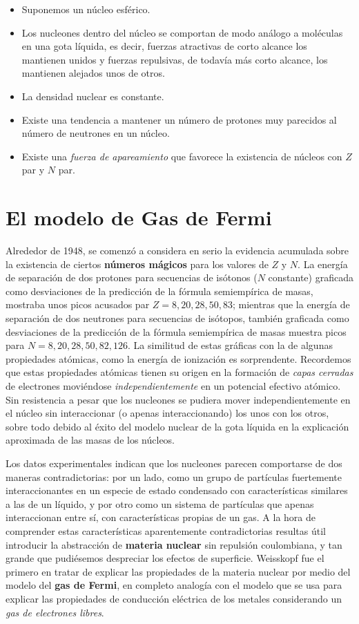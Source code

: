 \begin{itemize}
    \item Suponemos un núcleo esférico.
    \item Los nucleones dentro del núcleo se comportan de modo análogo a moléculas en una gota líquida, es decir, fuerzas atractivas de corto alcance los mantienen unidos y fuerzas repulsivas, de todavía más corto alcance, los mantienen alejados unos de otros.
    \item La densidad nuclear es constante. 
    \item Existe una tendencia a mantener un número de protones muy parecidos al número de neutrones en un núcleo.
    \item Existe una \textit{fuerza de apareamiento} que favorece la existencia de núcleos con $Z$ par y $N$ par.
\end{itemize}

\section{El modelo de Gas de Fermi}

Alrededor de 1948, se comenzó a considera en serio la evidencia acumulada sobre la existencia de ciertos \textbf{números mágicos} para los valores de $Z$ y $N$. La energía de separación de dos protones para secuencias de isótonos ($N$ constante) graficada como desviaciones de la predicción de la fórmula semiempírica de masas, mostraba unos picos acusados par $Z=8,20,28,50,83$; mientras que la energía de separación de dos neutrones para secuencias de isótopos, también graficada como desviaciones de la predicción de la fórmula semiempírica de masas muestra picos para $N=8,20,28,50,82,126$. La similitud de estas gráficas con la de algunas propiedades atómicas, como la energía de ionización es sorprendente. Recordemos que estas propiedades atómicas tienen su origen en la formación de \textit{capas cerradas} de electrones moviéndose \textit{independientemente} en un potencial efectivo atómico. Sin resistencia a pesar que los nucleones se pudiera mover independientemente en el núcleo sin interaccionar (o apenas interaccionando) los unos con los otros, sobre todo debido al éxito del modelo nuclear de la gota líquida en la explicación aproximada de las masas de los núcleos.

Los datos experimentales indican que los nucleones parecen comportarse de dos maneras contradictorias: por un lado, como un grupo de partículas fuertemente interaccionantes en un especie de estado condensado con características similares a las de un líquido, y por otro como un sistema de partículas que apenas interaccionan entre sí, con características propias de un gas. A la hora de comprender estas características aparentemente contradictorias resultas útil introducir la abstracción de \textbf{materia nuclear} sin repulsión coulombiana, y tan grande que pudiésemos despreciar los efectos de superficie. Weisskopf fue el primero en tratar de explicar las propiedades de la materia nuclear por medio del modelo del \textbf{gas de Fermi}, en completo analogía con el modelo que se usa para explicar las propiedades de conducción eléctrica de los metales considerando un \textit{gas de electrones libres}.

